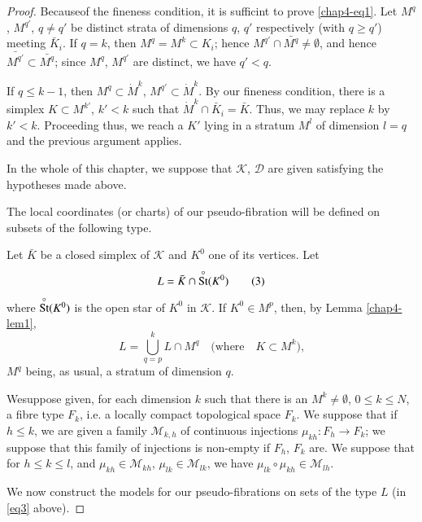\begin{proof} %
  Because\pageoriginale of the fineness condition, it is sufficint to prove
  \eqref{chap4-eq1}. Let $M^q$, $M^{q'}$, $q \neq q'$ be distinct strata of dimensions
  $q$, $q'$ respectively (with $q \geq q'$) meeting $\bar{K}_{i}$. If
  $q=k$, then $M^{q}=M^{k}\subset K_{i}$; hence $M^{q'}\cap
  \bar{M^{q}}\neq \emptyset$, and hence $\bar{M^{q'}}\subset
  \bar{M^{q}}$; since $M^{q}$, $M^{q'}$ are distinct, we have $q'<q$.

If $q\leq k-1$, then $M^{q}\subset \dot{M}^{k}$, $M^{q'}\subset
\dot{M}^{k}$. By our fineness condition, there is a simplex $K\subset
M^{k'}$, $k'<k$ such that $\dot{M}^{k}\cap \bar{K}_{i}=\bar{K}$. Thus,
we may replace $k$ by $k'<k$. Proceeding thus, we reach a $K'$ lying
in a stratum $M^{l}$ of dimension $l=q$ and the previous argument
applies. 


In the whole of this chapter, we suppose that $\mathscr{K}$,
$\mathscr{D}$ are given satisfying the hypotheses made above. 

The local coordinates (or charts) of our pseudo-fibration will be
defined on subsets of the following type. 

Let $\bar{K}$ be a closed simplex of $\mathscr{K}$ and $K^{0}$ one of
its vertices. Let
\begin{equation*}
L=\bar{K}\cap \overset{\circ}{\operatorname{St}}(K^{0})\tag{3}\label{eq3}
\end{equation*}
where $\overset{\circ}{\operatorname{St}}(K^0)$ is the open star of $K^{0}$ in
  $\mathscr{K}$. If $K^0 \in M^p$, then, by Lemma \ref{chap4-lem1}, 
\begin{equation*}
L=\bigcup^{k}_{q=p}L\cap M^{q}\quad\text{(where~~ $K\subset
  M^{k}$),}\tag{4}\label{eq4} 
\end{equation*}
$M^q$ being, as usual, a stratum of
  dimension $q$. 



We\pageoriginale suppose given, for each dimension $k$ such that there
is an $M^{k}\neq \emptyset$, $0\leq k\leq N$, a fibre type $F_{k}$,
i.e. a locally compact topological space $F_{k}$. We suppose that if
$h\leq k$, we are given a family $\mathscr{M}_{k,h}$ of continuous
injections $\mu_{kh}:F_{h}\to F_{k}$; we suppose that this family of
  injections is non-empty if $F_{h}$, $F_{k}$ are. We suppose that for
  $h\leq k\leq l$, and $\mu_{kh}\in \mathscr{M}_{kh}$, $\mu_{lk}\in
  \mathscr{M}_{lk}$, we have $\mu_{lk}\circ \mu_{kh}\in
  \mathscr{M}_{lh}$.

We now construct the models for our pseudo-fibrations on sets of the
type $L$ (in \eqref{eq3} above).


\end{proof}

